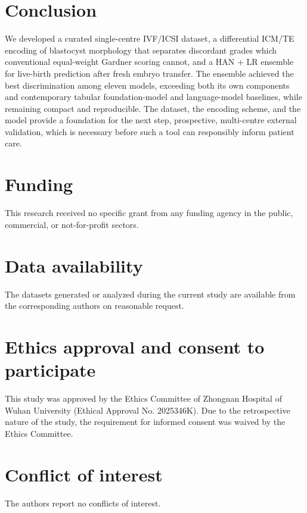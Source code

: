 \documentclass[12pt,a4paper]{article}
\begin{document}
\section*{Conclusion}

We developed a curated single-centre IVF/ICSI dataset, a differential ICM/TE encoding of blastocyst morphology that separates discordant grades which conventional equal-weight Gardner scoring cannot, and a HAN + LR ensemble for live-birth prediction after fresh embryo transfer. The ensemble achieved the best discrimination among eleven models, exceeding both its own components and contemporary tabular foundation-model and language-model baselines, while remaining compact and reproducible. The dataset, the encoding scheme, and the model provide a foundation for the next step, prospective, multi-centre external validation, which is necessary before such a tool can responsibly inform patient care.

\section*{Funding}
This research received no specific grant from any funding agency in the public, commercial, or not-for-profit sectors.

\section*{Data availability}
The datasets generated or analyzed during the current study are available from the corresponding authors on reasonable request.

\section*{Ethics approval and consent to participate}
This study was approved by the Ethics Committee of Zhongnan Hospital of Wuhan University (Ethical Approval No. 2025346K). Due to the retrospective nature of the study, the requirement for informed consent was waived by the Ethics Committee.

\section*{Conflict of interest}
The authors report no conflicts of interest.



{\footnotesize }
\end{document}
